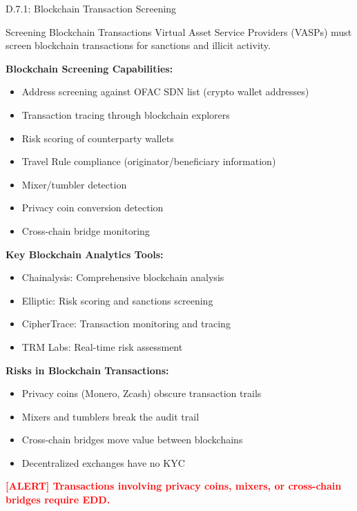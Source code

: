 \documentclass[11pt,a4paper]{beamer}
\newcommand{\redflag}[1]{\textcolor{red}{\textbf{[ALERT] #1}}}
\begin{document}
\begin{frame}{D.7.1: Blockchain Transaction Screening}
	\begin{block}{Screening Blockchain Transactions}
		Virtual Asset Service Providers (VASPs) must screen blockchain transactions for sanctions and illicit activity.
	\end{block}
	\textbf{Blockchain Screening Capabilities:}
	\begin{itemize}
		\item Address screening against OFAC SDN list (crypto wallet addresses)
		\item Transaction tracing through blockchain explorers
		\item Risk scoring of counterparty wallets
		\item Travel Rule compliance (originator/beneficiary information)
		\item Mixer/tumbler detection
		\item Privacy coin conversion detection
		\item Cross-chain bridge monitoring
	\end{itemize}
	\textbf{Key Blockchain Analytics Tools:}
	\begin{itemize}
		\item Chainalysis: Comprehensive blockchain analysis
		\item Elliptic: Risk scoring and sanctions screening
		\item CipherTrace: Transaction monitoring and tracing
		\item TRM Labs: Real-time risk assessment
	\end{itemize}
	\textbf{Risks in Blockchain Transactions:}
	\begin{itemize}
		\item Privacy coins (Monero, Zcash) obscure transaction trails
		\item Mixers and tumblers break the audit trail
		\item Cross-chain bridges move value between blockchains
		\item Decentralized exchanges have no KYC
	\end{itemize}
	\redflag{Transactions involving privacy coins, mixers, or cross-chain bridges require EDD.}
\end{frame}
\end{document}
